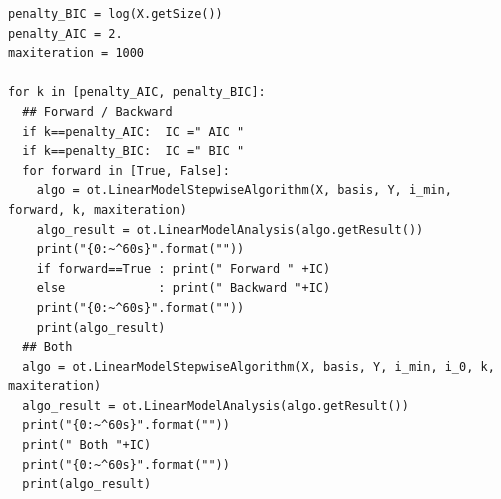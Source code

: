 \begin{lstlisting}[style=pythonStyle,basicstyle=\tiny]
penalty_BIC = log(X.getSize())
penalty_AIC = 2.
maxiteration = 1000

for k in [penalty_AIC, penalty_BIC]:
  ## Forward / Backward
  if k==penalty_AIC:  IC =" AIC "
  if k==penalty_BIC:  IC =" BIC "  
  for forward in [True, False]:
    algo = ot.LinearModelStepwiseAlgorithm(X, basis, Y, i_min, forward, k, maxiteration)
    algo_result = ot.LinearModelAnalysis(algo.getResult())
    print("{0:~^60s}".format(""))
    if forward==True : print(" Forward " +IC)
    else             : print(" Backward "+IC)
    print("{0:~^60s}".format(""))
    print(algo_result)
  ## Both
  algo = ot.LinearModelStepwiseAlgorithm(X, basis, Y, i_min, i_0, k, maxiteration)
  algo_result = ot.LinearModelAnalysis(algo.getResult())
  print("{0:~^60s}".format(""))
  print(" Both "+IC)
  print("{0:~^60s}".format(""))
  print(algo_result)
\end{lstlisting}

